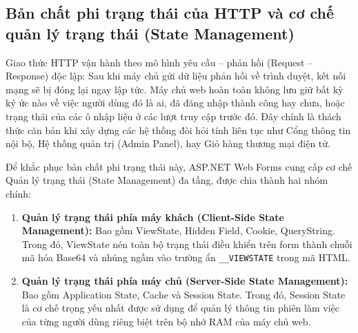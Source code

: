 \documentclass[12pt,a4paper]{report}
\begin{document}
\subsection{Bản chất phi trạng thái của HTTP và cơ chế quản lý trạng thái (State Management)}
Giao thức HTTP vận hành theo mô hình yêu cầu -- phản hồi (Request -- Response) độc lập: Sau khi máy chủ gửi dữ liệu phản hồi về trình duyệt, kết nối mạng sẽ bị đóng lại ngay lập tức. Máy chủ web hoàn toàn không lưu giữ bất kỳ ký ức nào về việc người dùng đó là ai, đã đăng nhập thành công hay chưa, hoặc trạng thái của các ô nhập liệu ở các lượt truy cập trước đó. Đây chính là thách thức căn bản khi xây dựng các hệ thống đòi hỏi tính liên tục như Cổng thông tin nội bộ, Hệ thống quản trị (Admin Panel), hay Giỏ hàng thương mại điện tử.

Để khắc phục bản chất phi trạng thái này, ASP.NET Web Forms cung cấp cơ chế Quản lý trạng thái (State Management) đa tầng, được chia thành hai nhóm chính:
\begin{enumerate}
    \item \textbf{Quản lý trạng thái phía máy khách (Client-Side State Management):} Bao gồm ViewState, Hidden Field, Cookie, QueryString. Trong đó, ViewState nén toàn bộ trạng thái điều khiển trên form thành chuỗi mã hóa Base64 và nhúng ngầm vào trường ẩn \texttt{\_\_VIEWSTATE} trong mã HTML.
    \item \textbf{Quản lý trạng thái phía máy chủ (Server-Side State Management):} Bao gồm Application State, Cache và Session State. Trong đó, Session State là cơ chế trọng yếu nhất được sử dụng để quản lý thông tin phiên làm việc của từng người dùng riêng biệt trên bộ nhớ RAM của máy chủ web.
\end{enumerate}
\end{document}
